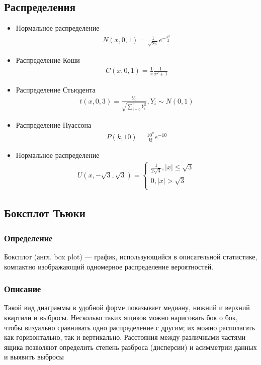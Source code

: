 \subsection{Распределения}
\begin{itemize}
    \item  Нормальное распределение \begin{gather*}
 N(x,0,1) = \frac{1}{\sqrt{2\pi}}e^{-\frac{x^{2}}{2}}
\end{gather*} 
    \item  Распределение Коши  
    \begin{gather*}
    C(x,0,1) = \frac{1}{\pi}\frac{1}{x^{2} + 1}
\end{gather*} 
    \item  Распределение Стьюдента   \begin{gather*}
 t(x,0,3) = \frac{Y_0}{\sqrt{\displaystyle\sum_{i=0}^{3} Y_i^{2}}}, Y_i \sim N(0,1)
\end{gather*} 
    \item  Распределение Пуассона
    \begin{gather*}
 P(k,10) = \frac{10^{k}}{k!}e^{-10}
\end{gather*} 
    \item  Нормальное распределение
    \begin{gather*}
U(x,-\sqrt{3}, \sqrt{3}) = \begin{cases}
\frac{1}{2\sqrt{3}}, |x| \leq \sqrt{3}\\
0,  |x| > \sqrt{3} \\ 
\end{cases}
\end{gather*}

\end{itemize}


\subsection{Боксплот Тьюки}
\subsubsection{Определение}
Боксплот (англ. box plot) — график, использующийся в описательной статистике, компактно изображающий одномерное распределение вероятностей.
\subsubsection{Описание}
Такой вид диаграммы в удобной форме показывает медиану, нижний и верхний квартили и выбросы.
Несколько таких ящиков можно нарисовать бок о бок, чтобы визуально сравнивать одно распределение с другим; их можно располагать как горизонтально, так и вертикально. Расстояния между различными частями ящика позволяют определить степень разброса (дисперсии) и асимметрии данных и выявить выбросы
